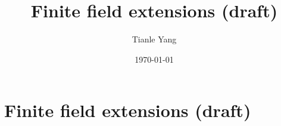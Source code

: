 \documentclass{noteformyself}
\title{Finite field extensions (draft)}
\author{Tianle Yang}
\date{\today}
\begin{document}
    \maketitle

    \section{Finite field extensions (draft)}



\end{document}
